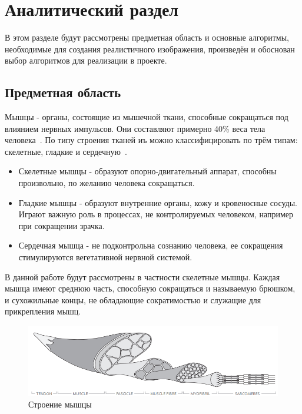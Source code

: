 \chapter{Аналитический раздел}
\label{cha:analysis}
 В этом разделе будут рассмотрены предметная область и основные алгоритмы, необходимые для создания реалистичного изображения, произведён и обоснован выбор алгоритмов для реализации в проекте.
\section{Предметная область}
\label{sec:item_ran}
Мышцы - органы, состоящие из мышечной ткани, способные сокращаться под влиянием нервных импульсов. Они составляют примерно 40\% веса тела человека~\cite{muscle_01}. По типу строения тканей иъ можно классифицировать по трём типам: скелетные, гладкие и сердечную~\cite{muscle_02}.
\begin{itemize}
	\item Скелетные мышцы - образуют опорно-двигательный аппарат, способны произвольно, по желанию человека сокращаться.
	\item Гладкие мышцы - образуют внутренние органы, кожу и кровеносные сосуды. Играют важную роль в процессах, не контролируемых человеком, например при сокращении зрачка.
	\item Сердечная мышца - не подконтрольна сознанию человека, ее сокращения стимулируются вегетативной нервной системой.
\end{itemize}
В данной работе будут рассмотрены в частности скелетные мышцы. Каждая мышца имеют среднюю часть, способную сокращаться и называемую брюшком, и сухожильные концы, не обладающие сократимостью и служащие для прикрепления мышц.
\begin{figure}
	\centering
	\includegraphics[width=0.7\linewidth]{images/muscle_struct}
	\caption[Строение мышцы]{Строение мышцы}
	\label{fig:musclestruct}
\end{figure}

